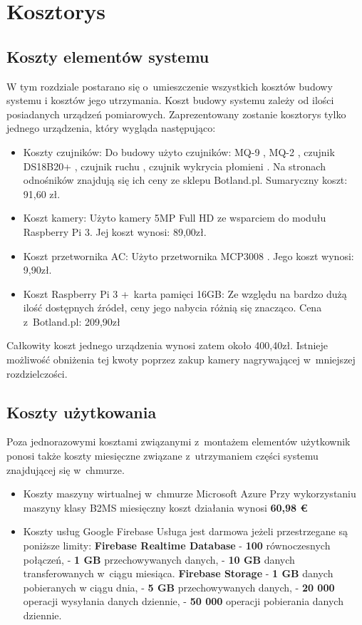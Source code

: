\chapter{Kosztorys}

\section{Koszty elementów systemu}
W tym rozdziale postarano się o~umieszczenie wszystkich kosztów budowy systemu i kosztów jego utrzymania. Koszt budowy systemu zależy od ilości posiadanych urządzeń pomiarowych. Zaprezentowany zostanie kosztorys tylko jednego urządzenia, który wygląda następująco:
\begin{itemize}
\item Koszty czujników:
Do budowy użyto czujników: MQ-9 \cite{specyfikacjaMQ-9}, MQ-2 \cite{specyfikacjaMQ-2}, czujnik DS18B20+ \cite{specyfikacjaTemp}, czujnik ruchu \cite{pir}, czujnik wykrycia płomieni \cite {specyfikacjaFlame}. Na stronach odnośników znajdują się ich ceny ze sklepu Botland.pl. Sumaryczny koszt: 91,60 zł.
\item Koszt kamery:
Użyto kamery 5MP Full HD ze wsparciem do modułu Raspberry Pi 3. Jej koszt wynosi: 89,00zł.
\item Koszt przetwornika AC:
Użyto przetwornika MCP3008 \cite{specyfikacjaAC}. Jego koszt wynosi: 9,90zł.
\item Koszt Raspberry Pi 3 +~karta pamięci 16GB: 
Ze względu na bardzo dużą ilość dostępnych źródeł, ceny jego nabycia różnią się znacząco. Cena z~Botland.pl: 209,90zł
\end{itemize}
Całkowity koszt jednego urządzenia wynosi zatem około 400,40zł. Istnieje możliwość obniżenia tej kwoty poprzez zakup kamery nagrywającej w~mniejszej rozdzielczości. 

\section{Koszty użytkowania}
Poza jednorazowymi kosztami związanymi z~montażem elementów użytkownik ponosi także koszty miesięczne związane z~utrzymaniem części systemu znajdującej się w~chmurze.
\begin{itemize}
    \item Koszty maszyny wirtualnej w~chmurze Microsoft Azure \newline
    Przy wykorzystaniu maszyny klasy B2MS miesięczny koszt działania wynosi \textbf{60,98 €}
    \item Koszty usług Google Firebase\newline
    Usługa jest darmowa jeżeli przestrzegane są poniższe limity:
    \subitem \textbf{Firebase Realtime Database}
    \subsubitem - \textbf{100} równoczesnych połączeń,
    \subsubitem - \textbf{1 GB} przechowywanych danych,
    \subsubitem - \textbf{10 GB} danych transferowanych w~ciągu miesiąca.
    \subitem \textbf{Firebase Storage}
    \subsubitem - \textbf{1 GB} danych pobieranych w ciągu dnia,
    \subsubitem - \textbf{5 GB} przechowywanych danych,
    \subsubitem - \textbf{20 000} operacji wysyłania danych dziennie,
    \subsubitem - \textbf{50 000} operacji pobierania danych dziennie.
\end{itemize}
